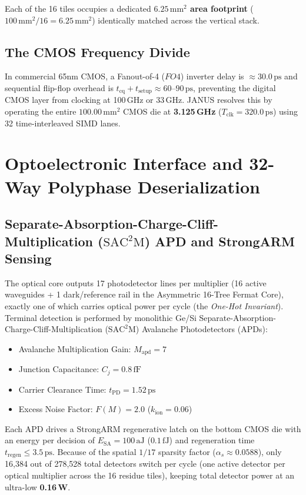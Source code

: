 \documentclass[10pt,journal,compsoc]{IEEEtran}
\begin{document}
Each of the 16 tiles occupies a dedicated \textbf{$6.25\,\text{mm}^2$ area footprint} ($100\,\text{mm}^2 / 16 = 6.25\,\text{mm}^2$) identically matched across the vertical stack.

\subsection{The CMOS Frequency Divide}
In commercial 65nm CMOS, a Fanout-of-4 ($FO4$) inverter delay is $\approx 30.0\,\text{ps}$ and sequential flip-flop overhead is $t_{\text{cq}} + t_{\text{setup}} \approx 60\text{--}90\,\text{ps}$, preventing the digital CMOS layer from clocking at 100\,GHz or 33\,GHz. JANUS resolves this by operating the entire $100.00\,\text{mm}^2$ CMOS die at \textbf{3.125\,GHz} ($T_{\text{clk}} = 320.0\,\text{ps}$) using 32 time-interleaved SIMD lanes.

\section{Optoelectronic Interface and 32-Way Polyphase Deserialization}\label{sec:optoelectronic}

\subsection{Separate-Absorption-Charge-Cliff-Multiplication ($\mathrm{SAC^2M}$) APD and StrongARM Sensing}
The optical core outputs 17 photodetector lines per multiplier (16 active waveguides + 1 dark/reference rail in the Asymmetric 16-Tree Fermat Core), exactly one of which carries optical power per cycle (the \textit{One-Hot Invariant}). Terminal detection is performed by monolithic Ge/Si Separate-Absorption-Charge-Cliff-Multiplication ($\mathrm{SAC^2M}$) Avalanche Photodetectors (APDs):
\begin{itemize}
    \item Avalanche Multiplication Gain: $M_{\text{apd}} = 7$
    \item Junction Capacitance: $C_j = 0.8\,\text{fF}$
    \item Carrier Clearance Time: $t_{\text{PD}} = 1.52\,\text{ps}$
    \item Excess Noise Factor: $F(M) = 2.0$ ($k_{\text{ion}} = 0.06$)
\end{itemize}

Each APD drives a StrongARM regenerative latch \cite{razavi2015strongarm} on the bottom CMOS die with an energy per decision of $E_{\text{SA}} = 100\,\text{aJ}$ ($0.1\,\text{fJ}$) and regeneration time $t_{\text{regen}} \le 3.5\,\text{ps}$. Because of the spatial $1/17$ sparsity factor ($\alpha_s \approx 0.0588$), only 16,384 out of 278,528 total detectors switch per cycle (one active detector per optical multiplier across the 16 residue tiles), keeping total detector power at an ultra-low \textbf{0.16\,W}.
\end{document}

